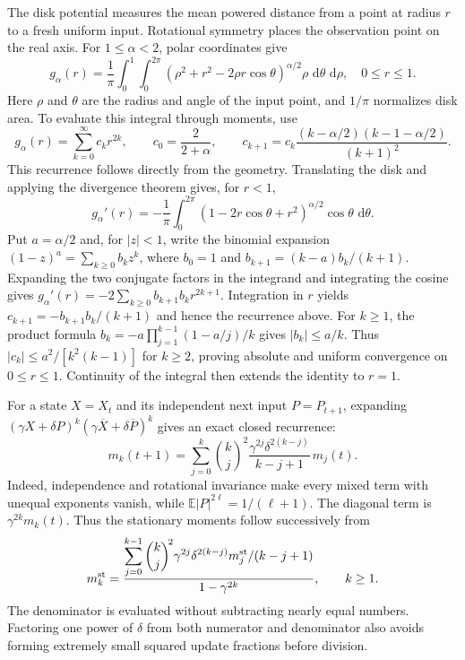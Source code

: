\documentclass[11pt,a4paper]{article}
\newcommand{\E}{\mathbb E}
\newcommand{\dd}{\,\mathrm d}
\begin{document}
The disk potential measures the mean powered distance from a point at radius $r$ to a fresh uniform input. Rotational symmetry places the observation point on the real axis. For $1\leq\alpha<2$, polar coordinates give
\begin{equation}
g_\alpha(r)=\frac1\pi\int_0^1\!\int_0^{2\pi}
(\rho^2+r^2-2\rho r\cos\theta)^{\alpha/2}\rho\,\dd\theta\,\dd\rho,
\quad 0\leq r\leq1.\label{eq:potential}
\end{equation}
Here $\rho$ and $\theta$ are the radius and angle of the input point, and $1/\pi$ normalizes disk area. To evaluate this integral through moments, use
\[
g_\alpha(r)=\sum_{k=0}^{\infty}c_kr^{2k},\qquad
c_0=\frac{2}{2+\alpha},\qquad
c_{k+1}=c_k\frac{(k-\alpha/2)(k-1-\alpha/2)}{(k+1)^2}.
\]
This recurrence follows directly from the geometry. Translating the disk and applying the divergence theorem gives, for $r<1$,
\[
g_\alpha'(r)=-\frac1\pi\int_0^{2\pi}
(1-2r\cos\theta+r^2)^{\alpha/2}\cos\theta\,\dd\theta.
\]
Put $a=\alpha/2$ and, for $|z|<1$, write the binomial expansion $(1-z)^a=\sum_{k\geq0}b_kz^k$, where $b_0=1$ and $b_{k+1}=(k-a)b_k/(k+1)$. Expanding the two conjugate factors in the integrand and integrating the cosine gives $g_\alpha'(r)=-2\sum_{k\geq0}b_{k+1}b_kr^{2k+1}$. Integration in $r$ yields $c_{k+1}=-b_{k+1}b_k/(k+1)$ and hence the recurrence above. For $k\geq1$, the product formula $b_k=-a\prod_{j=1}^{k-1}(1-a/j)/k$ gives $|b_k|\leq a/k$. Thus $|c_k|\leq a^2/[k^2(k-1)]$ for $k\geq2$, proving absolute and uniform convergence on $0\leq r\leq1$. Continuity of the integral then extends the identity to $r=1$.

For a state $X=X_t$ and its independent next input $P=P_{t+1}$, expanding $(\gamma X+\delta P)^k(\gamma\overline X+\delta\overline P)^k$ gives an exact closed recurrence:
\begin{equation}
m_k(t+1)=\sum_{j=0}^{k}\binom{k}{j}^{\!2}
\frac{\gamma^{2j}\delta^{2(k-j)}}{k-j+1}\,m_j(t).\label{eq:recurrence}
\end{equation}
Indeed, independence and rotational invariance make every mixed term with unequal exponents vanish, while $\E|P|^{2\ell}=1/(\ell+1)$. The diagonal term is $\gamma^{2k}m_k(t)$. Thus the stationary moments follow successively from
\begin{equation}
m_k^{\rm st}=\frac{\displaystyle\sum_{j=0}^{k-1}\binom{k}{j}^{\!2}
\gamma^{2j}\delta^{2(k-j)}m_j^{\rm st}/(k-j+1)}{1-\gamma^{2k}},\qquad k\geq1.\label{eq:stationary}
\end{equation}
The denominator is evaluated without subtracting nearly equal numbers. Factoring one power of $\delta$ from both numerator and denominator also avoids forming extremely small squared update fractions before division.
\end{document}
